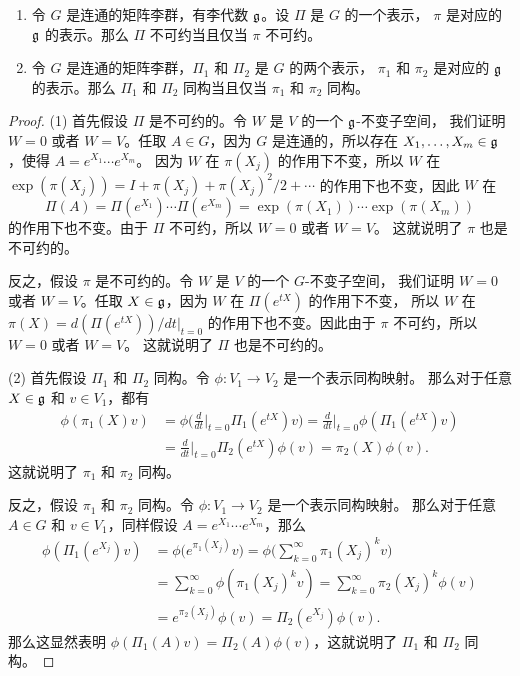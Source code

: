 \begin{proposition}
  \mbox{}
  \begin{enumerate}
    \item 令 $G$ 是连通的矩阵李群，有李代数 $\mathfrak{g}$。设 $\Pi$ 是 $G$ 的一个表示，
    $\pi$ 是对应的 $\mathfrak{g}$ 的表示。那么 $\Pi$ 不可约当且仅当 $\pi$ 不可约。
    \item 令 $G$ 是连通的矩阵李群，$\Pi_1$ 和 $\Pi_2$ 是 $G$ 的两个表示，
    $\pi_1$ 和 $\pi_2$ 是对应的 $\mathfrak{g}$ 的表示。那么 $\Pi_1$ 和 $\Pi_2$ 同构当且仅当
    $\pi_1$ 和 $\pi_2$ 同构。
  \end{enumerate}
\end{proposition}
\begin{proof}
  (1) 首先假设 $\Pi$ 是不可约的。令 $W$ 是 $V$ 的一个 $\mathfrak{g}$-不变子空间，
  我们证明 $W=0$ 或者 $W=V$。任取 $A\in G$，因为 $G$ 是连通的，所以存在
  $X_1,\dots,X_m\in\mathfrak{g}$，使得 $A=e^{X_1}\cdots e^{X_m}$。
  因为 $W$ 在 $\pi(X_j)$ 的作用下不变，所以 $W$ 在
  $\exp(\pi(X_j))=I+\pi(X_j)+\pi(X_j)^2/2+\cdots$ 的作用下也不变，因此
  $W$ 在
  \[
    \Pi(A)=\Pi(e^{X_1})\cdots \Pi(e^{X_m})=\exp(\pi(X_1))\cdots \exp(\pi(X_m))
  \]
  的作用下也不变。由于 $\Pi$ 不可约，所以 $W=0$ 或者 $W=V$。
  这就说明了 $\pi$ 也是不可约的。

  反之，假设 $\pi$ 是不可约的。令 $W$ 是 $V$ 的一个 $G$-不变子空间，
  我们证明 $W=0$ 或者 $W=V$。任取 $X\in \mathfrak{g}$，因为 $W$ 在 $\Pi(e^{tX})$ 的作用下不变，
  所以 $W$ 在 $\pi(X)=d(\Pi(e^{tX}))/dt|_{t=0}$ 的作用下也不变。因此由于 $\pi$ 不可约，所以 $W=0$ 或者 $W=V$。
  这就说明了 $\Pi$ 也是不可约的。

  (2) 首先假设 $\Pi_1$ 和 $\Pi_2$ 同构。令 $\phi:V_1\to V_2$ 是一个表示同构映射。
  那么对于任意 $X\in \mathfrak{g}$ 和 $v\in V_1$，都有
  \begin{align*}
    \phi(\pi_1(X)v)
    &=\phi\bigg(\frac{d}{dt}\bigg|_{t=0} \Pi_1(e^{tX})v\bigg) 
    =\frac{d}{dt}\bigg|_{t=0} \phi(\Pi_1(e^{tX})v) \\
    &=\frac{d}{dt}\bigg|_{t=0} \Pi_2(e^{tX})\phi(v) =\pi_2(X)\phi(v).
  \end{align*}
  这就说明了 $\pi_1$ 和 $\pi_2$ 同构。

  反之，假设 $\pi_1$ 和 $\pi_2$ 同构。令 $\phi:V_1\to V_2$ 是一个表示同构映射。
  那么对于任意 $A\in G$ 和 $v\in V_1$，同样假设 $A=e^{X_1}\cdots e^{X_m}$，那么 
  \begin{align*}
    \phi(\Pi_1(e^{X_j})v)
    &=\phi\bigl(e^{\pi_1(X_j)} v\bigr) 
    =\phi\bigg(\sum_{k=0}^\infty \pi_1(X_j)^kv\bigg) \\
    &=\sum_{k=0}^\infty \phi(\pi_1(X_j)^kv)=\sum_{k=0}^\infty \pi_2(X_j)^k\phi(v)\\
    &=e^{\pi_2(X_j)}\phi(v)=\Pi_2(e^{X_j})\phi(v).
  \end{align*}
  那么这显然表明 $\phi(\Pi_1(A)v)=\Pi_2(A)\phi(v)$，这就说明了 $\Pi_1$ 和 $\Pi_2$ 同构。
\end{proof}

